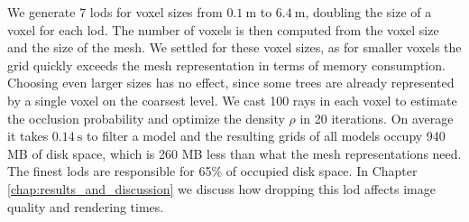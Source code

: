 We generate 7 \acsp{lod} for voxel sizes from $\SI{0.1}{\m}$ to $\SI{6.4}{\m}$, doubling the size of a voxel for each \ac{lod}.
The number of voxels is then computed from the voxel size and the size of the mesh.
We settled for these voxel sizes, as for smaller voxels the grid quickly exceeds the mesh representation in terms of memory consumption.
Choosing even larger sizes has no effect, since some trees are already represented by a single voxel on the coarsest level.
We cast 100 rays in each voxel to estimate the occlusion probability and optimize the density $\rho$ in 20 iterations. %
On average it takes $\SI{0.14}{\s}$ to filter a model and the resulting grids of all models occupy 940 MB of disk space, which is 260 MB less than what the mesh representations need.
The finest \acsp{lod} are responsible for 65\% of occupied disk space.
In Chapter \ref{chap:results_and_discussion} we discuss how dropping this \ac{lod} affects image quality and rendering times.

